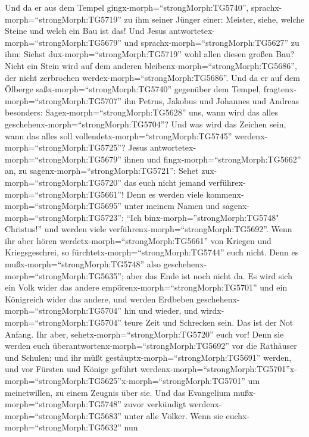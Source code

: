  Und da er aus dem Tempel
gingx-morph=``strongMorph:TG5740'', sprachx-morph=``strongMorph:TG5719''
zu ihm seiner Jünger einer: Meister, siehe, welche Steine und welch ein
Bau ist das!  Und Jesus
antwortetex-morph=``strongMorph:TG5679'' und
sprachx-morph=``strongMorph:TG5627'' zu ihm: Siehst
dux-morph=``strongMorph:TG5719'' wohl allen diesen großen Bau? Nicht ein
Stein wird auf dem anderen bleibenx-morph=``strongMorph:TG5686'', der
nicht zerbrochen werdex-morph=``strongMorph:TG5686''.  Und
da er auf dem Ölberge saßx-morph=``strongMorph:TG5740'' gegenüber dem
Tempel, fragtenx-morph=``strongMorph:TG5707'' ihn Petrus, Jakobus und
Johannes und Andreas besonders: 
Sagex-morph=``strongMorph:TG5628'' uns, wann wird das alles
geschehenx-morph=``strongMorph:TG5704''? Und was wird das Zeichen sein,
wann das alles soll vollendetx-morph=``strongMorph:TG5745''
werdenx-morph=``strongMorph:TG5725''?  Jesus
antwortetex-morph=``strongMorph:TG5679'' ihnen und
fingx-morph=``strongMorph:TG5662'' an, zu
sagenx-morph=``strongMorph:TG5721'': Sehet
zux-morph=``strongMorph:TG5720'' das euch nicht jemand
verführex-morph=``strongMorph:TG5661''!  Denn es werden
viele kommenx-morph=``strongMorph:TG5695'' unter meinem Namen und
sagenx-morph=``strongMorph:TG5723'': ``Ich
binx-morph=''strongMorph:TG5748" Christus!'' und werden viele
verführenx-morph=``strongMorph:TG5692''.  Wenn ihr aber
hören werdetx-morph=``strongMorph:TG5661'' von Kriegen und
Kriegsgeschrei, so fürchtetx-morph=``strongMorph:TG5744'' euch nicht.
Denn es mußx-morph=``strongMorph:TG5748'' also
geschehenx-morph=``strongMorph:TG5635''; aber das Ende ist noch nicht
da.  Es wird sich ein Volk wider das andere
empörenx-morph=``strongMorph:TG5701'' und ein Königreich wider das
andere, und werden Erdbeben geschehenx-morph=``strongMorph:TG5704'' hin
und wieder, und wirdx-morph=``strongMorph:TG5704'' teure Zeit und
Schrecken sein. Das ist der Not Anfang.  Ihr aber,
sehetx-morph=``strongMorph:TG5720'' euch vor! Denn sie werden euch
überantwortenx-morph=``strongMorph:TG5692'' vor die Rathäuser und
Schulen; und ihr müßt gestäuptx-morph=``strongMorph:TG5691'' werden, und
vor Fürsten und Könige geführt
werdenx-morph=``strongMorph:TG5701''\textbar x-morph=``strongMorph:TG5625''x-morph=``strongMorph:TG5701''
um meinetwillen, zu einem Zeugnis über sie.  Und das
Evangelium mußx-morph=``strongMorph:TG5748'' zuvor verkündigt
werdenx-morph=``strongMorph:TG5683'' unter alle Völker. 
Wenn sie euchx-morph=``strongMorph:TG5632'' nun
